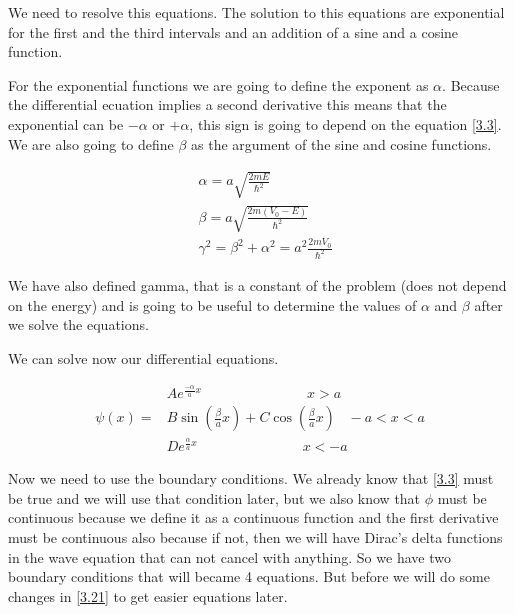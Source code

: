 We need to resolve this equations. The solution to this equations are exponential for the first and the third intervals and an addition of a sine and a cosine function.

For the exponential functions we are going to define the exponent as $\alpha$. Because the differential ecuation implies a second derivative this means that the exponential can be $-\alpha$ or $+\alpha$, this sign is going to depend on the equation \ref{3.3}. We are also going to define $\beta$ as the argument of the sine and cosine functions.

\begin{equation}
    \label{3.20}
    \begin{split}
        & \alpha = a\sqrt{\frac{2mE}{\hbar^2}}
        \\
        & \beta = a \sqrt{\frac{2m(V_0-E)}{\hbar^2}}
        \\
        & \gamma^2 = \beta^2 + \alpha^2 = a^2\frac{2mV_0}{\hbar^2} 
    \end{split}
\end{equation}

We have also defined gamma, that is a constant of the problem (does not depend on the energy) and is going to be useful to determine the values of $\alpha$ and $\beta$ after we solve the equations.

We can solve now our differential equations.

\begin{equation}
    \label{3.21}
    \begin{split}
                    & Ae^{\frac{-\alpha}{a}x} \hspace{90pt} x > a
                    \\
       \psi(x) =    & B \sin{(\frac{\beta}{a}x)} + C \cos{(\frac{\beta}{a}x)} \hspace{10pt} -a < x < a 
                    \\
                    & De^{\frac{\alpha}{a}x} \hspace{90pt} x < -a
    \end{split}
\end{equation}

Now we need to use the boundary conditions. We already know that \ref{3.3} must be true and we will use that condition later, but we also know that $\phi$ must be continuous because we define it as a continuous function and the first derivative must be continuous also because if not, then we will have Dirac's delta functions in the wave equation that can not cancel with anything. So we have two boundary conditions that will became 4 equations. But before we will do some changes in \ref{3.21} to get easier equations later.


